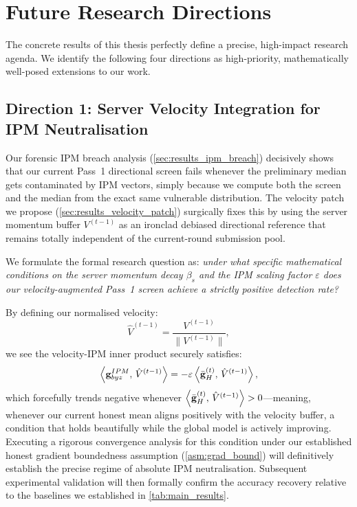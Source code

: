 \documentclass[../main.tex]{subfiles}
\begin{document}
\section{Future Research Directions}
\label{sec:conclusion_future}

The concrete results of this thesis perfectly define a precise, high-impact research agenda. We identify the following four directions as high-priority, mathematically well-posed extensions to our work.

\subsection{Direction 1: Server Velocity Integration for IPM Neutralisation}
\label{sec:future_velocity}

Our forensic IPM breach analysis (\cref{sec:results_ipm_breach}) decisively shows that our current Pass~1 directional screen fails whenever the preliminary median gets contaminated by IPM vectors, simply because we compute both the screen and the median from the exact same vulnerable distribution. The velocity patch we propose (\cref{sec:results_velocity_patch}) surgically fixes this by using the server momentum buffer $V^{(t-1)}$ as an ironclad debiased directional reference that remains totally independent of the current-round submission pool.

We formulate the formal research question as: \emph{under what specific mathematical conditions on the server momentum decay $\beta_s$ and the IPM scaling factor $\varepsilon$ does our velocity-augmented Pass~1 screen achieve a strictly positive detection rate?}

By defining our normalised velocity:
\begin{equation}
    \hat{V}^{(t-1)} = \frac{V^{(t-1)}}{\|V^{(t-1)}\|},
    \label{eq:future_norm_velocity}
\end{equation}
we see the velocity-IPM inner product securely satisfies:
\begin{equation}
    \left\langle \mathbf{g}_{byz}^{IPM},\, \hat{V}^{(t-1)} \right\rangle = -\varepsilon \left\langle \bar{\mathbf{g}}_{H}^{(t)},\, \hat{V}^{(t-1)} \right\rangle,
    \label{eq:future_ipm_velocity}
\end{equation}
which forcefully trends negative whenever $\left\langle \bar{\mathbf{g}}_{H}^{(t)},\, \hat{V}^{(t-1)} \right\rangle > 0$---meaning, whenever our current honest mean aligns positively with the velocity buffer, a condition that holds beautifully while the global model is actively improving. Executing a rigorous convergence analysis for this condition under our established honest gradient boundedness assumption (\cref{asm:grad_bound}) will definitively establish the precise regime of absolute IPM neutralisation. Subsequent experimental validation will then formally confirm the accuracy recovery relative to the baselines we established in \cref{tab:main_results}.
\end{document}
